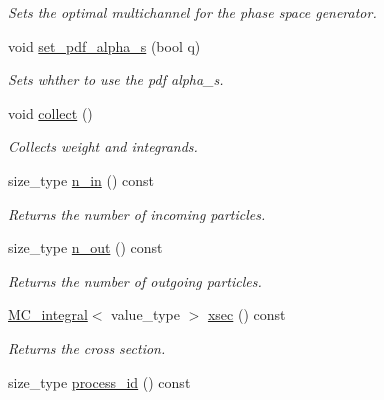 \begin{DoxyCompactItemize}
\begin{DoxyCompactList}\small\item\em Sets the optimal multichannel for the phase space generator. \end{DoxyCompactList}\item 
\hypertarget{a00436_a3aabcbc95ce33eb7470d0835fb819e9d}{}void \hyperlink{a00436_a3aabcbc95ce33eb7470d0835fb819e9d}{set\+\_\+pdf\+\_\+alpha\+\_\+s} (bool q)\label{a00436_a3aabcbc95ce33eb7470d0835fb819e9d}

\begin{DoxyCompactList}\small\item\em Sets whther to use the pdf alpha\+\_\+s. \end{DoxyCompactList}\item 
\hypertarget{a00436_aec5ea6224c468400b25db59f91fe18f6}{}void \hyperlink{a00436_aec5ea6224c468400b25db59f91fe18f6}{collect} ()\label{a00436_aec5ea6224c468400b25db59f91fe18f6}

\begin{DoxyCompactList}\small\item\em Collects weight and integrands. \end{DoxyCompactList}\item 
\hypertarget{a00436_ae6df2a426c0cf72984ab3f7efd799aad}{}size\+\_\+type \hyperlink{a00436_ae6df2a426c0cf72984ab3f7efd799aad}{n\+\_\+in} () const \label{a00436_ae6df2a426c0cf72984ab3f7efd799aad}

\begin{DoxyCompactList}\small\item\em Returns the number of incoming particles. \end{DoxyCompactList}\item 
\hypertarget{a00436_a96a001cf583b9e4d3078dab87e98bfa4}{}size\+\_\+type \hyperlink{a00436_a96a001cf583b9e4d3078dab87e98bfa4}{n\+\_\+out} () const \label{a00436_a96a001cf583b9e4d3078dab87e98bfa4}

\begin{DoxyCompactList}\small\item\em Returns the number of outgoing particles. \end{DoxyCompactList}\item 
\hypertarget{a00436_ae03964c8381d615c25a1528ad4a37387}{}\hyperlink{a00368}{M\+C\+\_\+integral}$<$ value\+\_\+type $>$ \hyperlink{a00436_ae03964c8381d615c25a1528ad4a37387}{xsec} () const \label{a00436_ae03964c8381d615c25a1528ad4a37387}

\begin{DoxyCompactList}\small\item\em Returns the cross section. \end{DoxyCompactList}\item 
\hypertarget{a00436_a56d70495e4d75f6a59d719c11fd56129}{}size\+\_\+type \hyperlink{a00436_a56d70495e4d75f6a59d719c11fd56129}{process\+\_\+id} () const \label{a00436_a56d70495e4d75f6a59d719c11fd56129}


\end{DoxyCompactItemize}
